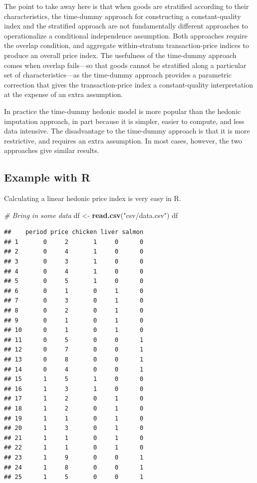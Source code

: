 \documentclass[]{article}
\newenvironment{Shaded}{\begin{snugshade}}{\end{snugshade}}
\newcommand{\CommentTok}[1]{\textcolor[rgb]{0.56,0.35,0.01}{\textit{#1}}}
\newcommand{\KeywordTok}[1]{\textcolor[rgb]{0.13,0.29,0.53}{\textbf{#1}}}
\newcommand{\NormalTok}[1]{#1}
\newcommand{\StringTok}[1]{\textcolor[rgb]{0.31,0.60,0.02}{#1}}
\begin{document}
The point to take away here is that when goods are stratified according to their characteristics, the time-dummy approach for constructing a constant-quality index and the stratified approach are not fundamentally different approaches to operationalize a conditional independence assumption. Both approaches require the overlap condition, and aggregate within-stratum transaction-price indices to produce an overall price index. The usefulness of the time-dummy approach comes when overlap fails---so that goods cannot be stratified along a particular set of characteristics---as the time-dummy approach provides a parametric correction that gives the transaction-price index a constant-quality interpretation at the expense of an extra assumption.

In practice the time-dummy hedonic model is more popular than the hedonic imputation approach, in part because it is simpler, easier to compute, and less data intensive. The disadvantage to the time-dummy approach is that it is more restrictive, and requires an extra assumption. In most cases, however, the two approaches give similar results.

\hypertarget{example-with-r-3}{%
\subsection{Example with R}\label{example-with-r-3}}

Calculating a linear hedonic price index is very easy in R.

\begin{Shaded}
\begin{Highlighting}[]
\CommentTok{# Bring in some data}
\NormalTok{df <-}\StringTok{ }\KeywordTok{read.csv}\NormalTok{(}\StringTok{"csv/data.csv"}\NormalTok{)}
\NormalTok{df}
\end{Highlighting}
\end{Shaded}

\begin{verbatim}
##    period price chicken liver salmon
## 1       0     2       1     0      0
## 2       0     4       1     0      0
## 3       0     3       1     0      0
## 4       0     4       1     0      0
## 5       0     5       1     0      0
## 6       0     1       0     1      0
## 7       0     3       0     1      0
## 8       0     2       0     1      0
## 9       0     1       0     1      0
## 10      0     1       0     1      0
## 11      0     5       0     0      1
## 12      0     7       0     0      1
## 13      0     8       0     0      1
## 14      0     4       0     0      1
## 15      1     5       1     0      0
## 16      1     3       1     0      0
## 17      1     2       0     1      0
## 18      1     2       0     1      0
## 19      1     1       0     1      0
## 20      1     3       0     1      0
## 21      1     1       0     1      0
## 22      1     1       0     1      0
## 23      1     9       0     0      1
## 24      1     8       0     0      1
## 25      1     5       0     0      1
\end{verbatim}
\end{document}
